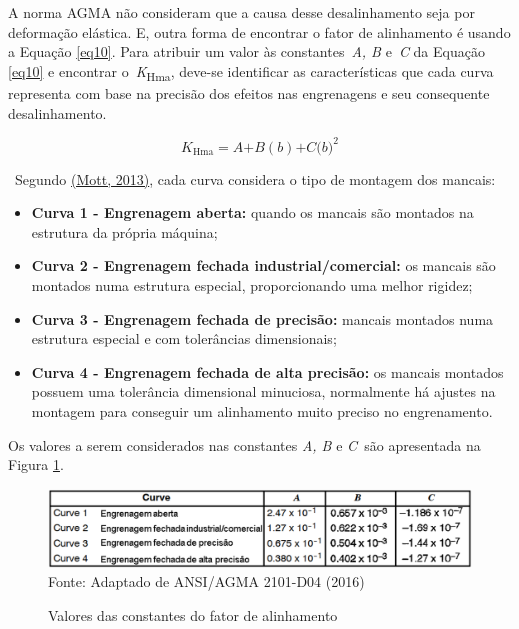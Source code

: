 \documentclass[12pt,a4paper]{article}
\providecommand{\tightlist}{\setlength{\itemsep}{0pt}\setlength{\parskip}{0pt}}%
\begin{document}
A norma AGMA não consideram que a causa desse desalinhamento seja por
deformação elástica. E, outra forma de encontrar o fator de alinhamento
é usando a Equação {\ref{eq10}}. Para atribuir um valor
às constantes~\emph{A, B} e~\emph{C} da Equação
{\ref{eq10}} e encontrar o~\emph{K}\textsubscript{Hma},
deve-se identificar as características que cada curva representa com
base na precisão dos efeitos nas engrenagens e seu consequente
desalinhamento.

\begin{equation}
    \label{eq10}
K_{\mathrm{Hma}}\mathrm{=}A\mathrm{+}B\left(b\right)\mathrm{+}C{\mathrm{(}b\mathrm{)}}^{\mathrm{2}}
\end{equation}

~Segundo \hyperref[csl:21]{(Mott, 2013)}, cada curva considera o tipo de montagem dos
mancais:

\begin{itemize}
\tightlist
\item
  \textbf{Curva 1 - Engrenagem aberta:} quando os mancais são montados
  na estrutura da própria máquina;
\item
  \textbf{Curva 2 - Engrenagem fechada industrial/comercial:} os mancais
  são montados numa estrutura especial, proporcionando uma melhor
  rigidez;
\item
  \textbf{Curva 3 - Engrenagem fechada de precisão:} mancais montados
  numa estrutura especial e com tolerâncias dimensionais;
\item
  \textbf{Curva 4 - Engrenagem fechada de alta precisão:} os mancais
  montados possuem uma tolerância dimensional minuciosa, normalmente há
  ajustes na montagem para conseguir um alinhamento muito preciso no
  engrenamento.
\end{itemize}

Os valores a serem considerados nas constantes \emph{A, B} e
\emph{C~}são apresentada na Figura {\ref{fig:13}}.

\begin{figure}[!htb]
    \centering
    \caption{Valores das constantes do fator de alinhamento}
    \includegraphics[scale=0.5]{Imagens/Img13.png}\\
    {\footnotesize Fonte: Adaptado de ANSI/AGMA 2101-D04 (2016)}
    \label{fig:13}
\end{figure}
\end{document}
